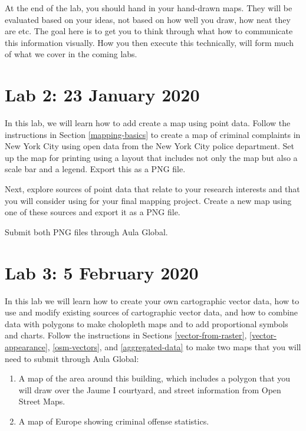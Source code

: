 \documentclass[]{book}
\providecommand{\tightlist}{%
  \setlength{\itemsep}{0pt}\setlength{\parskip}{0pt}}
\begin{document}
At the end of the lab, you should hand in your hand-drawn maps. They will be evaluated based on your ideas, not based on how well you draw, how neat they are etc. The goal here is to get you to think through what how to communicate this information visually. How you then execute this technically, will form much of what we cover in the coming labs.

\hypertarget{lab-2-23-january-2020}{%
\section*{Lab 2: 23 January 2020}\label{lab-2-23-january-2020}}

In this lab, we will learn how to add create a map using point data. Follow the instructions in Section \ref{mapping-basics} to create a map of criminal complaints in New York City using open data from the New York City police department. Set up the map for printing using a layout that includes not only the map but also a scale bar and a legend. Export this as a PNG file.

Next, explore sources of point data that relate to your research interests and that you will consider using for your final mapping project. Create a new map using one of these sources and export it as a PNG file.

Submit both PNG files through Aula Global.

\hypertarget{lab-3-5-february-2020}{%
\section*{Lab 3: 5 February 2020}\label{lab-3-5-february-2020}}

In this lab we will learn how to create your own cartographic vector data, how to use and modify existing sources of cartographic vector data, and how to combine data with polygons to make cholopleth maps and to add proportional symbols and charts. Follow the instructions in Sections \ref{vector-from-raster}, \ref{vector-appearance}, \ref{osm-vectors}, and \ref{aggregated-data} to make two maps that you will need to submit through Aula Global:

\begin{enumerate}
\def\labelenumi{\arabic{enumi}.}
\tightlist
\item
  A map of the area around this building, which includes a polygon that you will draw over the Jaume I courtyard, and street information from Open Street Maps.
\item
  A map of Europe showing criminal offense statistics.
\end{enumerate}
\end{document}
